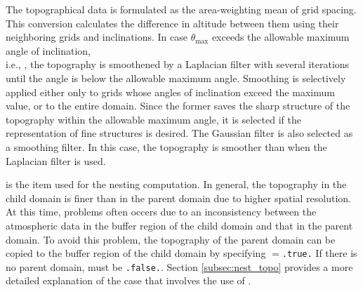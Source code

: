 The topographical data is formulated as the area-weighting mean of grid spacing.
This conversion calculates the difference in altitude between them using their neighboring grids and inclinations.
In case $\theta_{\max}$ exceeds the allowable maximum angle of inclination, \\
i.e., , the topography is smoothened by a Laplacian filter with several iterations until the angle is below the allowable maximum angle.
Smoothing is selectively applied either only to grids whose angles of inclination exceed the maximum value, or to the entire domain.
Since the former saves the sharp structure of the topography within the allowable maximum angle, it is selected if the representation of fine structures is desired.
The Gaussian filter is also selected as a smoothing filter. In this case, the topography is smoother than when the Laplacian filter is used.

 is the item used for the nesting computation.
In general, the topography in the child domain is finer than in the parent domain due to higher spatial resolution.
At this time, problems often occers due to 
an inconsistency between 
the atmospheric data in the buffer region of the child domain and that in the parent domain.
To avoid this problem, the topography of the parent domain can be copied to the buffer region of the child domain by specifying $=$\verb|.true.| If there is no parent domain,  must be \verb|.false.|. Section \ref{subsec:nest_topo} provides a more detailed explanation of the case that involves the use of .
